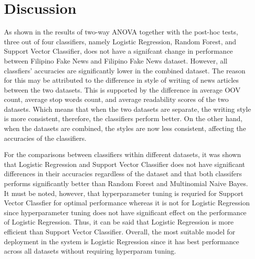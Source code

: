 \chapter{Discussion}

As shown in the results of two-way ANOVA together with the post-hoc tests, three out of four classifiers, namely Logistic Regression, Random Forest, and Support Vector Classifier, does not have a signifcant change in performance between Filipino Fake News and Filipino Fake News dataset. However, all classfiers' accuracies are significantly lower in the combined dataset. The reason for this may be attributed to the difference in style of writing of news articles between the two datasets. This is supported by the difference in average OOV count, average stop words count, and average readability scores of the two datasets. Which means that when the two datasets are separate, the writing style is more consistent, therefore, the classifiers perform better. On the other hand, when the datasets are combined, the styles are now less consistent, affecting the accuracies of the classifiers. 

For the comparisons between classifiers within different datasets, it was shown that Logistic Regression and Support Vector Classifier does not have significant differences in their accuracies regardless of the dataset and that both classifers performs significantly better than Random Forest and Multinomial Naive Bayes. It must be noted, however, that hyperparameter tuning is requried for Support Vector Classfier for optimal performance whereas it is not for Logistic Regression since hyperparameter tuning does not have significant effect on the performance of Logistic Regression. Thus, it can be said that Logistic Regression is more efficient than Support Vector Classifier. Overall, the most suitable model for deployment in the system is Logistic Regression since it has best performance across all datasets without requiring hyperparam tuning.